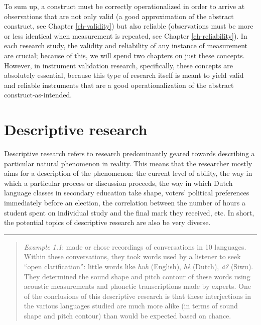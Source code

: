 \documentclass[
]{book}
\begin{document}
To sum up, a construct must be correctly operationalized in order to arrive at observations that are not only valid (a good approximation of the abstract construct, see Chapter \ref{ch-validity}) but also reliable (observations must be more or less identical when measurement is repeated, see Chapter \ref{ch-reliability}). In each research study, the validity and reliability of any instance of measurement are crucial; because of this, we will spend two chapters on just these concepts. However, in instrument validation research, specifically, these concepts are absolutely essential, because this type of research itself is meant to yield valid and reliable instruments that are a good operationalization of the abstract construct-as-intended.

\hypertarget{sec:descriptive-research}{%
\section{Descriptive research}\label{sec:descriptive-research}}

Descriptive research refers to research predominantly geared towards describing a particular natural phenomenon in reality. This means that the researcher mostly aims for a description of the phenomenon: the current level of ability, the way in which a particular process or discussion proceeds, the way in which Dutch language classes in secondary education take shape, voters' political preferences immediately before an election, the correlation between the number of hours a student spent on individual study and the final mark they received, etc. In short, the potential topics of descriptive research are also be very diverse.

\begin{center}\rule{0.5\linewidth}{0.5pt}\end{center}

\begin{quote}
\emph{Example 1.1}: \citet{DTE13} made or chose recordings of conversations in 10 languages. Within these conversations, they took words used by a listener to seek ``open clarification'': little words like \emph{huh} (English), \emph{hè} (Dutch), \emph{ã?} (Siwu). They determined the sound shape and pitch contour of these words using acoustic measurements and phonetic transcriptions made by experts. One of the conclusions of this descriptive research is that these interjections in the various languages studied are much more alike (in terms of sound shape and pitch contour) than would be expected based on chance.
\end{quote}
\end{document}
